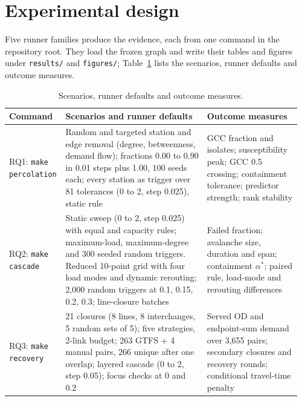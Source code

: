 
\section{Experimental design}
\label{sec:experiments}

Five runner families produce the evidence, each from one command in the
repository root. They load the frozen graph and write their tables and figures
under \texttt{results/} and \texttt{figures/}; Table~\ref{tab:design} lists the
scenarios, runner defaults and outcome measures.

\begin{table}[t]
  \centering
  \scriptsize
  \setlength{\tabcolsep}{4pt}
  \caption{Scenarios, runner defaults and outcome measures.}
  \label{tab:design}
  \begin{tabular}{@{}p{0.16\linewidth} p{0.48\linewidth} p{0.32\linewidth}@{}}
    \toprule
    Command & Scenarios and runner defaults & Outcome measures \\
    \midrule
    RQ1: \texttt{make percolation} &
    Random and targeted station and edge removal (degree, betweenness, demand
    flow); fractions 0.00 to 0.90 in 0.01 steps plus 1.00, 100 seeds each;
    every station as trigger over 81 tolerances (0 to 2, step 0.025), static
    rule &
    GCC fraction and isolates; susceptibility peak; GCC 0.5 crossing;
    containment tolerance; predictor strength; rank stability \\
    \addlinespace
    RQ2: \texttt{make cascade} &
    Static sweep (0 to 2, step 0.025) with equal and capacity rules;
    maximum-load, maximum-degree and 300 seeded random triggers. Reduced
    10-point grid with four load modes and dynamic rerouting; 2{,}000 random
    triggers at 0.1, 0.15, 0.2, 0.3; line-closure batches &
    Failed fraction; avalanche size, duration and span; containment
    $\alpha^*$; paired rule, load-mode and rerouting differences \\
    \addlinespace
    RQ3: \texttt{make recovery} &
    21 closures (8 lines, 8 interchanges, 5 random sets of 5); five strategies,
    2-link budget; 263 GTFS + 4 manual pairs, 266 unique after one overlap;
    layered cascade (0 to 2, step 0.05); focus checks at 0 and 0.2 &
    Served OD and endpoint-sum demand over 3{,}655 pairs; secondary closures
    and recovery rounds; conditional travel-time penalty \\

\end{tabular}
\end{table}
